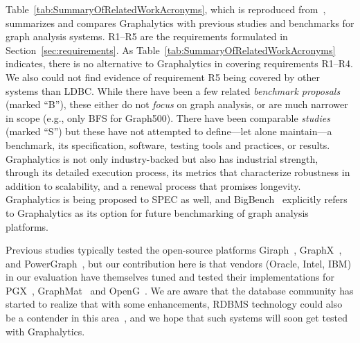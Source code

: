 Table~\ref{tab:SummaryOfRelatedWorkAcronyms}, which is reproduced from~\cite{DBLP:journals/pvldb/IosupHNHPMCCSATXNB16}, summarizes and compares Graphalytics with previous studies and benchmarks for graph analysis systems. R1--R5 are the requirements formulated in Section~\ref{sec:requirements}. 
As Table~\ref{tab:SummaryOfRelatedWorkAcronyms} indicates, there is no alternative to Graphalytics in covering requirements R1--R4. We also could not find evidence of requirement R5 being covered by other systems than LDBC.
While there have been a few related \emph{benchmark proposals} (marked ``B''), these either do not {\em focus} on graph analysis, or are much narrower in scope (e.g., only BFS for Graph500).
There have been comparable \emph{studies} (marked ``S'') but these have not attempted to define---let alone maintain---a benchmark, its specification, software, testing tools and practices, or results.
Graphalytics is not only industry-backed but also has industrial strength, through its detailed execution process, its metrics that characterize robustness in addition to scalability, and a renewal process that promises longevity.
Graphalytics is being proposed to SPEC as well, and BigBench~\cite{DBLP:conf/sigmod/GhazalRHRPCJ13,DBLP:conf/sigmod/RablFDJG15} explicitly refers to Graphalytics as its option for future benchmarking of graph analysis platforms. 


Previous studies typically tested the open-source platforms Giraph~\cite{DBLP:books/sp/SOAK2016}, GraphX~\cite{xin2013graphx}, and 
PowerGraph~\cite{gonzalez2012powergraph}, but our contribution here is that vendors (Oracle, Intel, IBM) in our evaluation have themselves tuned and tested their implementations for PGX~\cite{DBLP:conf/sc/HongDMLVC15}, GraphMat~\cite{sundaram2015graphmat} and OpenG~\cite{DBLP:conf/sc/NaiXTKL15}. We are aware that the database community has started to realize that with some enhancements, RDBMS technology could also be a contender in this area~\cite{fan2015case,jindal2014vertexica}, and we hope that such systems will soon get tested with Graphalytics. 

